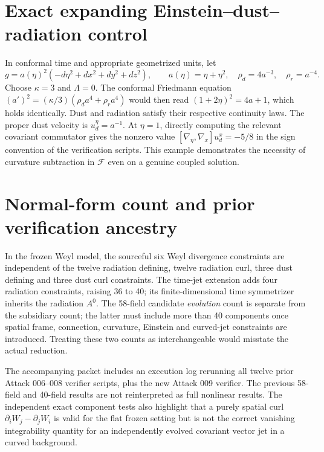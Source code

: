 \documentclass[11pt,a4paper]{article}
\newcommand{\cF}{\mathcal F}
\newcommand{\kap}{\kappa}
\begin{document}
\appendix
\section{Exact expanding Einstein--dust--radiation control}\label{app:flrw}
In conformal time and appropriate geometrized units, let
\[g=a(\eta)^2(-d\eta^2+dx^2+dy^2+dz^2),\qquad a(\eta)=\eta+\eta^2,\quad
\rho_d=4a^{-3},\quad\rho_r=a^{-4}.\]
Choose $\kap=3$ and $\Lambda=0$. The conformal Friedmann equation $(a')^2=(\kap/3)(\rho_d a^4+\rho_r a^4)$ would then read $(1+2\eta)^2=4a+1$, which holds identically. Dust and radiation satisfy their respective continuity laws. The proper dust velocity is $u_d^\eta=a^{-1}$. At $\eta=1$, directly computing the relevant covariant commutator gives the nonzero value $[\nabla_\eta,\nabla_x]u_d^x=-5/8$ in the sign convention of the verification scripts. This example demonstrates the necessity of curvature subtraction in $\cF$ even on a genuine coupled solution.

\section{Normal-form count and prior verification ancestry}
In the frozen Weyl model, the sourceful six Weyl divergence constraints are independent of the twelve radiation defining, twelve radiation curl, three dust defining and three dust curl constraints. The time-jet extension adds four radiation constraints, raising 36 to 40; its finite-dimensional time symmetrizer inherits the radiation $A^0$. The 58-field candidate \emph{evolution} count is separate from the subsidiary count; the latter must include more than 40 components once spatial frame, connection, curvature, Einstein and curved-jet constraints are introduced. Treating these two counts as interchangeable would misstate the actual reduction.

The accompanying packet includes an execution log rerunning all twelve prior Attack 006--008 verifier scripts, plus the new Attack 009 verifier. The previous 58-field and 40-field results are not reinterpreted as full nonlinear results. The independent exact component tests also highlight that a purely spatial curl $\partial_iW_j-\partial_jW_i$ is valid for the flat frozen setting but is not the correct vanishing integrability quantity for an independently evolved covariant vector jet in a curved background.
\end{document}
